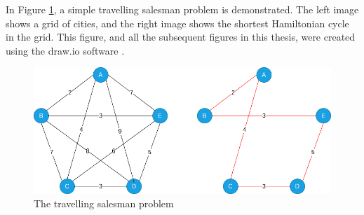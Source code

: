 In Figure \ref{fig:tsp}, a simple travelling salesman problem is demonstrated. The left image shows a grid of cities, and the right image shows the shortest Hamiltonian cycle in the grid. This figure, and all the subsequent figures in this thesis, were created using the draw.io software \citep{drawio}.

\begin{figure}[!htbp]
	\centering
	\includegraphics[scale=0.5]{../images/TSP.png}
	\caption{The travelling salesman problem}
    \label{fig:tsp}
\end{figure}